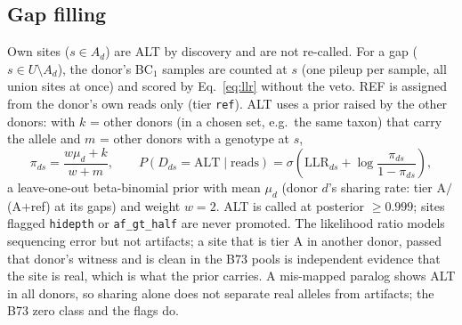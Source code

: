 \documentclass[11pt]{article}
\newcommand{\ALT}{\mathrm{ALT}}
\newcommand{\LLR}{\mathrm{LLR}}
\newcommand{\code}[1]{\texttt{#1}}
\begin{document}
\subsection{Gap filling}
Own sites ($s\in A_d$) are ALT by discovery and are not re-called. For a gap ($s\in U\setminus A_d$), the donor's BC$_1$ samples are counted
at $s$ (one pileup per sample, all union sites at once) and scored by Eq.~\eqref{eq:llr} without the veto. REF is assigned from the donor's
own reads only (tier \code{ref}). ALT uses a prior raised by the other donors: with $k$ = other donors (in a chosen set, e.g.\ the same
taxon) that carry the allele and $m$ = other donors with a genotype at $s$,
\begin{equation}
\pi_{ds}=\frac{w\mu_d+k}{w+m},\qquad
P(D_{ds}=\ALT\mid\text{reads})=\sigma\!\left(\LLR_{ds}+\log\frac{\pi_{ds}}{1-\pi_{ds}}\right),
\label{eq:eb}
\end{equation}
a leave-one-out beta-binomial prior with mean $\mu_d$ (donor $d$'s sharing rate: tier A$/$(A$+$ref) at its gaps) and weight $w=2$.
ALT is called at posterior $\ge0.999$; sites flagged \code{hidepth} or \code{af\_gt\_half} are never promoted.
The likelihood ratio models sequencing error but not artifacts; a site that is tier A in another donor, passed that donor's witness and is
clean in the B73 pools is independent evidence that the site is real, which is what the prior carries. A mis-mapped paralog shows ALT in all
donors, so sharing alone does not separate real alleles from artifacts; the B73 zero class and the flags do.
\end{document}
